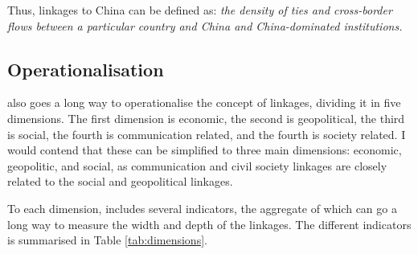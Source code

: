 Thus, linkages to China can be defined as: \textit{the density of ties and cross-border flows between a particular country and China and China-dominated institutions.}

\subsection{Operationalisation}
\citet{levitsky_linkage_2006} also goes a long way to operationalise the concept of linkages, dividing it in five dimensions. The first dimension is economic, the second is geopolitical, the third is social, the fourth is communication related, and the fourth is society related. I would contend that these can be simplified to three main dimensions: economic, geopolitic, and social, as communication and civil society linkages are closely related to the social and geopolitical linkages. 

To each dimension, \citet{levitsky_linkage_2006} includes several indicators, the aggregate of which can go a long way to measure the width and depth of the linkages. The different indicators is summarised in Table \ref{tab:dimensions}. 

\begin{table}[hbt!]
\centering
\caption{Five dimensions of linkages}
\label{tab:dimensions}
\vspace{0.5em}
\end{table}

